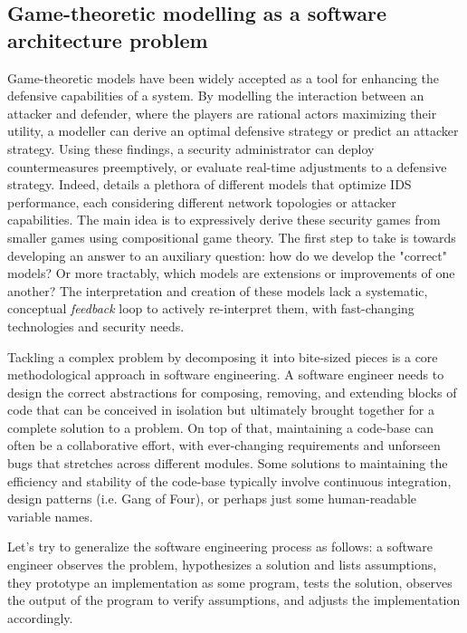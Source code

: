 \documentclass[11pt,titlepage,dvipsnames,table,xcdraw,english]{article}
\begin{document}
\subsection{Game-theoretic modelling as a software architecture problem}

Game-theoretic models have been widely accepted as a tool for enhancing the defensive capabilities of a system. By modelling the interaction between an attacker and defender, where the players are rational actors maximizing their utility, a modeller can derive an optimal defensive strategy or predict an attacker strategy. Using these findings, a security administrator can deploy countermeasures preemptively, or evaluate real-time adjustments to a defensive strategy. Indeed, \cite{kiennertSurveyGameTheoreticApproaches2018} details a plethora of different models that optimize IDS performance, each considering different network topologies or attacker capabilities. The main idea is to expressively derive these security games from smaller games using compositional game theory. The first step to take is towards developing an answer to an auxiliary question: how do we develop the "correct" models? Or more tractably, which models are extensions or improvements of one another? The interpretation and creation of these models lack a systematic, conceptual \textit{feedback} loop to actively re-interpret them, with fast-changing technologies and security needs.  

Tackling a complex problem by decomposing it into bite-sized pieces is a core methodological approach in software engineering. A software engineer needs to design the correct abstractions for composing, removing, and extending blocks of code that can be conceived in isolation but ultimately brought together for a complete solution to a problem. On top of that, maintaining a code-base can often be a collaborative effort, with ever-changing requirements and unforseen bugs that stretches across different modules. Some solutions to maintaining the efficiency and stability of the code-base typically involve continuous integration, design patterns (i.e. Gang of Four), or perhaps just some human-readable variable names. 

Let's try to generalize the software engineering process as follows: a software engineer observes the problem, hypothesizes a solution and lists assumptions, they prototype an implementation as some program, tests the solution, observes the output of the program to verify assumptions, and adjusts the implementation accordingly.
\end{document}
